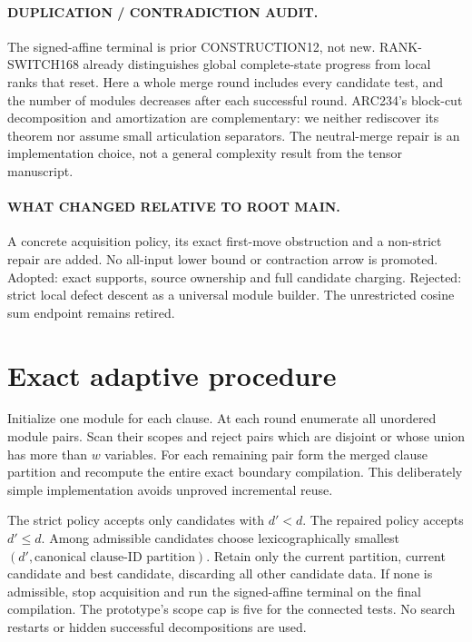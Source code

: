 \documentclass[11pt]{article}
\begin{document}
\paragraph{DUPLICATION / CONTRADICTION AUDIT.}
The signed-affine terminal is prior CONSTRUCTION12, not new.
RANK-SWITCH168 already distinguishes global complete-state progress from
local ranks that reset. Here a whole merge round includes every candidate
test, and the number of modules decreases after each successful round.
ARC234's block-cut decomposition and amortization are complementary:
we neither rediscover its theorem nor assume small articulation separators.
The neutral-merge repair is an implementation choice, not a general
complexity result from the tensor manuscript.

\paragraph{WHAT CHANGED RELATIVE TO ROOT MAIN.}
A concrete acquisition policy, its exact first-move obstruction and
a non-strict repair are added. No all-input lower bound or contraction
arrow is promoted. Adopted: exact supports, source ownership and full
candidate charging. Rejected: strict local defect descent as a universal
module builder. The unrestricted cosine sum endpoint remains retired.

\section{Exact adaptive procedure}
Initialize one module for each clause. At each round enumerate all unordered
module pairs. Scan their scopes and reject pairs which are disjoint or whose
union has more than $w$ variables. For each remaining pair form the merged
clause partition and recompute the entire exact boundary compilation.
This deliberately simple implementation avoids unproved incremental reuse.

The strict policy accepts only candidates with $d'<d$.
The repaired policy accepts $d'\le d$.
Among admissible candidates choose lexicographically smallest
$(d',\text{canonical clause-ID partition})$.
Retain only the current partition, current candidate and best candidate,
discarding all other candidate data. If none is admissible, stop acquisition
and run the signed-affine terminal on the final compilation.
The prototype's scope cap is five for the connected tests.
No search restarts or hidden successful decompositions are used.
\end{document}
